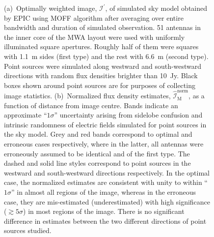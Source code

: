 \documentclass[a4paper,fleqn,usenatbib]{mnras}
\begin{document}
\begin{figure}
\caption{(a)~Optimally weighted image, $\mathcal{I}^\prime$, of simulated sky model obtained by EPIC using MOFF algorithm after averaging over entire bandwidth and duration of simulated observation. 51 antennas in the inner core of the MWA layout were used with uniformly illuminated square apertures. Roughly half of them were squares with 1.1~m sides (first type) and the rest with 6.6~m (second type). Point sources were simulated along westward and south-westward directions with random flux densities brighter than 10~Jy. Black boxes shown around point sources are for purposes of collecting image statistics. (b)~Normalized flux density estimates, $\widehat{\mathcal{I}}_\textrm{M}^\textrm{norm}$, as a function of distance from image centre. Bands indicate an approximate ``$1\sigma$'' uncertainty arising from sidelobe confusion and intrinsic randomness of electric fields simulated for point sources in the sky model. Grey and red bands correspond to optimal and erroneous cases respectively, where in the latter, all antennas were erroneously assumed to be identical and of the first type. The dashed and solid line styles correspond to point sources in the westward and south-westward directions respectively. In the optimal case, the normalized estimates are consistent with unity to within ``$1\sigma$'' in almost all regions of the image, whereas in the erroneous case, they are mis-estimated (underestimated) with high significance ($\gtrsim 5\sigma$) in most regions of the image. There is no significant difference in estimates between the two different directions of point sources studied.}
\label{fig:versatility}
\end{figure}
\end{document}
